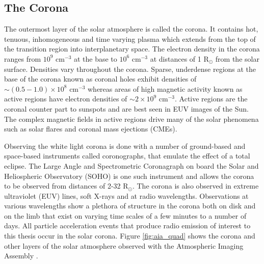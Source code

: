 \subsection{The Corona}
The outermost layer of the solar atmosphere is called the corona. It contains hot, tenuous, inhomogeneous and time varying plasma which extends from the top of the transition region into interplanetary space.
The electron density in the corona ranges from $10^{9} \mbox{ cm}^{-3}$ at the base to $10^{6} \mbox{ cm}^{-3}$ at distances of 1 R$_{\odot}$ from the solar surface. Densities vary throughout the corona. Sparse, underdense regions at the base of the corona known as coronal holes exhibit densities of $\sim ( 0.5 - 1.0) \times 10^8 \mbox{ cm}^{-3}$ whereas areas of high magnetic activity known as active regions have electron densities of $\sim 2 \times 10^9 \mbox{ cm}^{-3}$. Active regions are the coronal counter part to sunspots and are best seen in EUV images of the Sun. The complex magnetic fields in active regions drive many of the solar phenomena such as solar flares and coronal mass ejections (CMEs).

Observing the white light corona is done with a number of ground-based and space-based instruments called coronographs, that emulate the effect of a total eclipse. The Large Angle and Spectrometric Coronagraph \citep[LASCO;][]{Brueckner1995} on board the Solar and Heliospheric Observatory (SOHO) is one such instrument and allows the corona to be observed from distances of 2-32 R$_\odot$. The corona is also observed in extreme ultraviolet (EUV) lines, soft X-rays and at radio wavelengths. Observations at various wavelengths show a plethora of structure in the corona both on disk and on the limb that exist on varying time scales of a few minutes to a number of days. All particle acceleration events that produce radio emission of interest to this thesis occur in the solar corona. Figure \ref{fig:aia_quad} shows the corona and other layers of the solar atmosphere observed with the Atmospheric Imaging Assembly \citep[AIA;][]{Lemen2012}.

